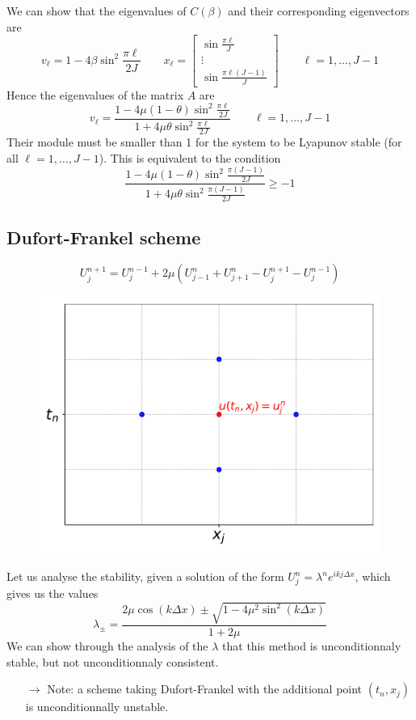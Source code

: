 \documentclass[12pt, openany]{report}
\theoremstyle{definition}
\begin{document}
We can show that the eigenvalues of $C(\beta)$ and their corresponding eigenvectors are 
\begin{equation}
	v_\ell = 1-4\beta \sin^2 \frac{\pi \ell}{2J} \qquad x_\ell = \begin{bmatrix}
		\sin\frac{\pi \ell}{J} \\ \vdots \\ \sin \frac{\pi \ell(J-1)}{J}
	\end{bmatrix} \qquad  \ell=1,\dots, J-1 
\end{equation}
Hence the eigenvalues of the matrix $A$ are 
\begin{equation}
	v_\ell = \frac{1-4\mu(1-\theta) \sin^2\frac{\pi \ell}{2J}}{1+4\mu\theta \sin^2 \frac{\pi \ell}{2J}} \qquad \ell = 1,\dots,J-1
\end{equation}
Their module must be smaller than 1 for the system to be Lyapunov stable (for all $\ell= 1,\dots,J-1$). This is equivalent to the condition 
\begin{equation}
	\frac{1-4\mu(1-\theta) \sin^2\frac{\pi (J-1)}{2J}}{1+4\mu\theta \sin^2 \frac{\pi (J-1)}{2J}} \ge -1
\end{equation}
\subsection{Dufort-Frankel scheme}
\begin{equation}
	U_j^{n+1} = U_j^{n-1} + 2\mu \left(U_{j-1}^n + U_{j+1}^n - U_j^{n+1}-U_j^{n-1}\right)
\end{equation}
\begin{figure}[H]
	\centering
	\includegraphics[width = .4\textwidth]{img/DF.pdf}
\end{figure}
Let us analyse the stability, given a solution of the form $U_j^n = \lambda^n e^{ikj\Delta x}$, which gives us the values
\begin{equation}
	\lambda_\pm = \frac{2\mu \cos(k\Delta x) \pm \sqrt{1-4\mu^2\sin^2(k\Delta x)}}{1+2\mu}
\end{equation}
We can show through the analysis of the $\lambda$ that this method is unconditionnaly stable, but not unconditionnaly consistent. 
\begin{itemize}
	\item [$\to$] Note: a scheme taking Dufort-Frankel with the additional point $(t_n, x_j)$ is unconditionnally unstable. 
\end{itemize}
\end{document}
